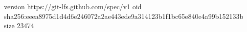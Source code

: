 version https://git-lfs.github.com/spec/v1
oid sha256:eeea8975d1d4d6e246072a2ae443ede9a314123b1f1bc65e840e4a99b152133b
size 23474
